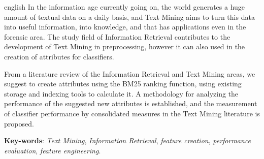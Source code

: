 \setlength{\absparsep}{18pt} %
\begin{resumo}[Abstract]
    \begin{otherlanguage*}{english}
        In the information age currently going on, the world generates a huge amount of textual data on a daily basis, and Text Mining aims to turn this data into useful information, into knowledge, and that has applications even in the forensic area.
        The study field of Information Retrieval contributes to the development of Text Mining in preprocessing, however it can also used in the creation of attributes for classifiers.
        
        From a literature review of the Information Retrieval and Text Mining areas, we suggest to create attributes using the BM25 ranking function, using existing storage and indexing tools to calculate it.
        A methodology for analyzing the performance of the suggested new attributes is established, and the measurement of classifier performance by consolidated measures in the Text Mining literature is proposed.
        	
    	\vspace{\onelineskip}
    
    	\noindent
    	\textbf{Key-words}: \textit{Text Mining}, \textit{Information Retrieval}, \textit{feature creation}, \textit{performance evaluation}, \textit{feature engineering}.

    \end{otherlanguage*}
\end{resumo}